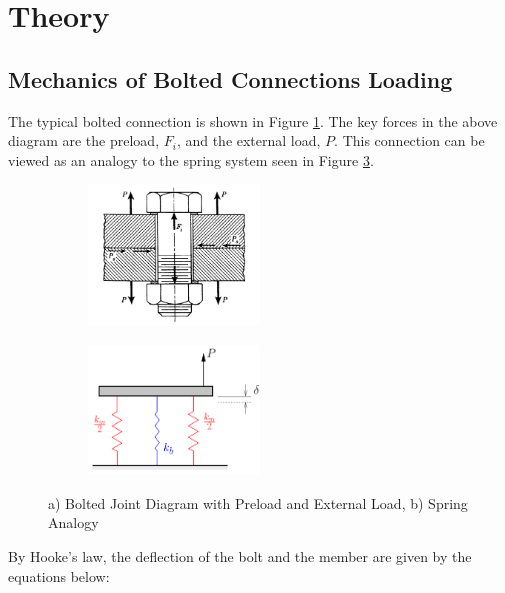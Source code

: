\section{Theory}
\subsection{Mechanics of Bolted Connections Loading}
The typical bolted connection is shown in Figure \ref{fig:bolted_joint_diagram}. The key forces in the above diagram are the preload, $F_i$, and the external load, $P$. This connection can be viewed as an analogy to the spring system seen in Figure \ref{fig:spring_analogy}.
\begin{figure}[h]
    \centering
    \begin{subfigure}[b]{0.4\textwidth}
        \centering
        \includegraphics[width=0.5\textwidth]{Sections/Figures/bolted connection force diagram.png}
        \caption{}
        \label{fig:bolted_joint_diagram}
    \end{subfigure}
    \begin{subfigure}[b]{0.4\textwidth}
        \centering
        \includegraphics[width=0.5\textwidth]{Sections/Figures/spring analogy.png}
        \caption{}
        \label{fig:spring_analogy}
    \end{subfigure}
    \caption{a) Bolted Joint Diagram with Preload and External Load, b) Spring Analogy}
\end{figure}
By Hooke's law, the deflection of the bolt and the member are given by the equations below:

